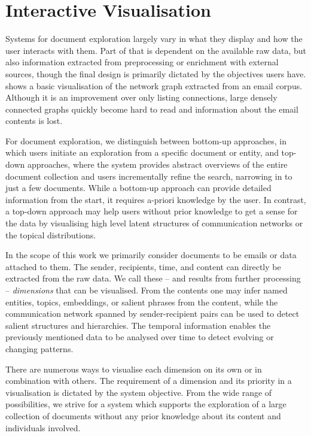 \section{Interactive Visualisation}
Systems for document exploration largely vary in what they display and how the user interacts with them.
Part of that is dependent on the available raw data, but also information extracted from preprocessing or enrichment with external sources, though the final design is primarily dictated by the objectives users have.
 shows a basic visualisation of the network graph extracted from an email corpus.
Although it is an improvement over only listing connections, large densely connected graphs quickly become hard to read and information about the email contents is lost.

For document exploration, we distinguish between bottom-up approaches, in which users initiate an exploration from a specific document or entity, and top-down approaches, where the system provides abstract overviews of the entire document collection and users incrementally refine the search, narrowing in to just a few documents.
While a bottom-up approach can provide detailed information from the start, it requires a-priori knowledge by the user.
In contrast, a top-down approach may help users without prior knowledge to get a sense for the data by visualising high level latent structures of communication networks or the topical distributions.

In the scope of this work we primarily consider documents to be emails or data attached to them.
The sender, recipients, time, and content can directly be extracted from the raw data.
We call these -- and results from further processing -- \textit{dimensions} that can be visualised.
From the contents one may infer named entities, topics, embeddings, or salient phrases from the content, while the communication network spanned by sender-recipient pairs can be used to detect salient structures and hierarchies.
The temporal information enables the previously mentioned data to be analysed over time to detect evolving or changing patterns.

There are numerous ways to visualise each dimension on its own or in combination with others.
The requirement of a dimension and its priority in a visualisation is dictated by the system objective.
From the wide range of possibilities, we strive for a system which supports the exploration of a large collection of documents without any prior knowledge about its content and individuals involved.

